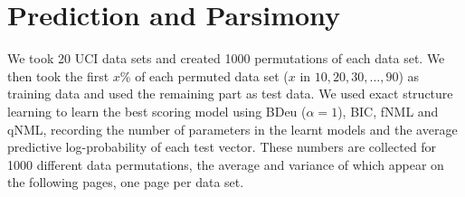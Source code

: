 \section{Prediction and Parsimony}

We took 20 UCI data sets and created 1000 permutations of each data set.
We then took the first $x$\% of each permuted data set ($x$ in
${10,20,30,\ldots,90}$) as training data and used the remaining part as
test data. We used exact structure learning to learn the best
scoring model using BDeu ($\alpha=1$), BIC, fNML and qNML,
recording the number of parameters in the learnt
models and the average predictive log-probability of each test
vector. These numbers are collected for 1000 different data
permutations, the average and variance of which appear on the following
pages, one page per data set.

